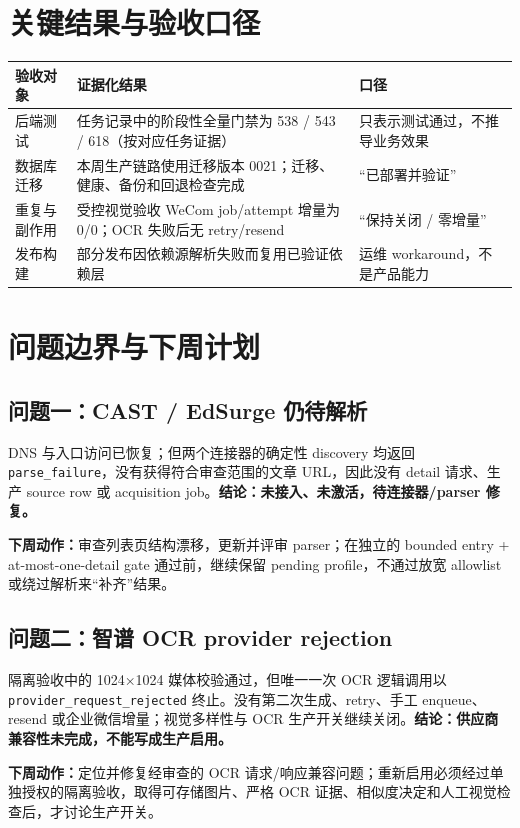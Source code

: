 \documentclass[UTF8,11pt,a4paper,fontset=none]{ctexart}
\begin{document}
\section{关键结果与验收口径}
\noindent\begin{tabularx}{\textwidth}{L{3.3cm}Y L{3.0cm}}\toprule
{}\color{white}\bfseries\sffamily 验收对象&\color{white}\bfseries\sffamily 证据化结果&\color{white}\bfseries\sffamily 口径\\\midrule
后端测试&任务记录中的阶段性全量门禁为 538 / 543 / 618（按对应任务证据）&只表示测试通过，不推导业务效果\\
数据库迁移&本周生产链路使用迁移版本 0021；迁移、健康、备份和回退检查完成&“已部署并验证”\\
重复与副作用&受控视觉验收 WeCom job/attempt 增量为 0/0；OCR 失败后无 retry/resend&“保持关闭 / 零增量”\\
发布构建&部分发布因依赖源解析失败而复用已验证依赖层&运维 workaround，不是产品能力\\\bottomrule\end{tabularx}
\section{问题边界与下周计划}
\subsection{问题一：CAST / EdSurge 仍待解析}
\begin{riskbox}
DNS 与入口访问已恢复；但两个连接器的确定性 discovery 均返回 \texttt{parse\_failure}，没有获得符合审查范围的文章 URL，因此没有 detail 请求、生产 source row 或 acquisition job。\textbf{结论：未接入、未激活，待连接器/parser 修复。}
\end{riskbox}
\noindent\textbf{下周动作：}审查列表页结构漂移，更新并评审 parser；在独立的 bounded entry + at-most-one-detail gate 通过前，继续保留 pending profile，不通过放宽 allowlist 或绕过解析来“补齐”结果。
\subsection{问题二：智谱 OCR provider rejection}
\begin{riskbox}
隔离验收中的 1024×1024 媒体校验通过，但唯一一次 OCR 逻辑调用以 \texttt{provider\_request\_rejected} 终止。没有第二次生成、retry、手工 enqueue、resend 或企业微信增量；视觉多样性与 OCR 生产开关继续关闭。\textbf{结论：供应商兼容性未完成，不能写成生产启用。}
\end{riskbox}
\noindent\textbf{下周动作：}定位并修复经审查的 OCR 请求/响应兼容问题；重新启用必须经过单独授权的隔离验收，取得可存储图片、严格 OCR 证据、相似度决定和人工视觉检查后，才讨论生产开关。
\end{document}
